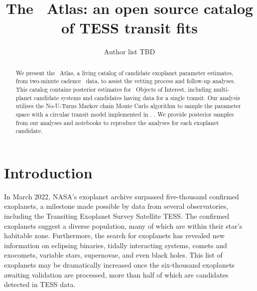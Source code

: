 \documentclass[floatfix,ApJL,twocolumn]{aastex631}
\begin{document}
\title{The \tess\ Atlas: an open source catalog of TESS transit fits}


\author{Author list TBD}
% 





\begin{abstract}
We present the \tess\ Atlas, a living catalog of candidate exoplanet parameter estimates, from two-minute cadence \tess\  data, to assist the vetting process and follow-up analyses.
This catalog contains posterior estimates for \red{\numAnalysed} \tess\ Objects of Interest, including \red{\numAnalysedMulti} multi-planet candidate systems and \red{\numAnalysedSingle} candidates having data for a single transit. 
Our analysis utilises the No-U-Turns Markov chain Monte Carlo algorithm to sample the parameter space with a circular transit model implemented in \exoplanet. 
. 
We provide posterior samples from our analyses and \jupyter notebooks to reproduce the analyses for each exoplanet candidate. 

\end{abstract}




\section{Introduction} \label{sec:intro}

In March 2022, NASA's exoplanet archive surpassed five-thousand confirmed exoplanets, a milestone made possible by data from several observatories, including the Transiting Exoplanet Survey Satellite TESS.
The confirmed exoplanets suggest a diverse population, many of which are within their star's habitable zone. 
Furthermore, the search for exoplanets has revealed new information on eclipsing binaries, tidally interacting systems,  comets and exocomets, variable stars, supernovae, and even black holes. 
This list of exoplanets may be dramatically increased once the six-thousand exoplanets awaiting validation are processed, more than half of which are candidates detected in TESS data.
\end{document}

